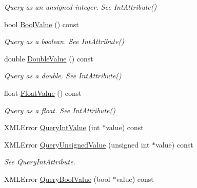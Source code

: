 \begin{DoxyCompactItemize}
\begin{DoxyCompactList}\small\item\em Query as an unsigned integer. See Int\-Attribute() \end{DoxyCompactList}\item 
\hypertarget{classtinyxml2_1_1_x_m_l_attribute_a2f78700d500e5c72062e0418525fa1fa}{bool \hyperlink{classtinyxml2_1_1_x_m_l_attribute_a2f78700d500e5c72062e0418525fa1fa}{Bool\-Value} () const }\label{classtinyxml2_1_1_x_m_l_attribute_a2f78700d500e5c72062e0418525fa1fa}

\begin{DoxyCompactList}\small\item\em Query as a boolean. See Int\-Attribute() \end{DoxyCompactList}\item 
\hypertarget{classtinyxml2_1_1_x_m_l_attribute_a5133bf83273a3174ca456db6cec77847}{double \hyperlink{classtinyxml2_1_1_x_m_l_attribute_a5133bf83273a3174ca456db6cec77847}{Double\-Value} () const }\label{classtinyxml2_1_1_x_m_l_attribute_a5133bf83273a3174ca456db6cec77847}

\begin{DoxyCompactList}\small\item\em Query as a double. See Int\-Attribute() \end{DoxyCompactList}\item 
\hypertarget{classtinyxml2_1_1_x_m_l_attribute_ac6c8a3fa9b224fd420421efc84ee5399}{float \hyperlink{classtinyxml2_1_1_x_m_l_attribute_ac6c8a3fa9b224fd420421efc84ee5399}{Float\-Value} () const }\label{classtinyxml2_1_1_x_m_l_attribute_ac6c8a3fa9b224fd420421efc84ee5399}

\begin{DoxyCompactList}\small\item\em Query as a float. See Int\-Attribute() \end{DoxyCompactList}\item 
X\-M\-L\-Error \hyperlink{classtinyxml2_1_1_x_m_l_attribute_ae3f29daec6956ee49a840d54b207f1c6}{Query\-Int\-Value} (int $\ast$value) const 
\item 
\hypertarget{classtinyxml2_1_1_x_m_l_attribute_a7cab00c7cf2eeb72b515317e442caf73}{X\-M\-L\-Error \hyperlink{classtinyxml2_1_1_x_m_l_attribute_a7cab00c7cf2eeb72b515317e442caf73}{Query\-Unsigned\-Value} (unsigned int $\ast$value) const }\label{classtinyxml2_1_1_x_m_l_attribute_a7cab00c7cf2eeb72b515317e442caf73}

\begin{DoxyCompactList}\small\item\em See Query\-Int\-Attribute. \end{DoxyCompactList}\item 
\hypertarget{classtinyxml2_1_1_x_m_l_attribute_a668d06dad8f7609ae1fdd8fa8dbd177d}{X\-M\-L\-Error \hyperlink{classtinyxml2_1_1_x_m_l_attribute_a668d06dad8f7609ae1fdd8fa8dbd177d}{Query\-Bool\-Value} (bool $\ast$value) const }\label{classtinyxml2_1_1_x_m_l_attribute_a668d06dad8f7609ae1fdd8fa8dbd177d}


\end{DoxyCompactItemize}
